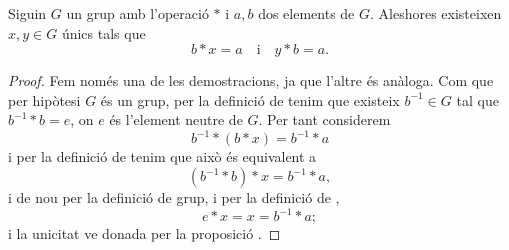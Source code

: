 \documentclass[../Apunts.tex]{subfiles}
\begin{document}
	\begin{lemma}
		\label{lema:solucions úniques en grups a equacions}
		Siguin \(G\) un grup amb l'operació \(\ast\) i \(a,b\) dos elements de \(G\). Aleshores existeixen \(x,y\in G\) únics tals que
		\[b\ast x=a\quad\text{i}\quad y\ast b=a.\]
		\begin{proof}
			Fem només una de les demostracions, ja que l'altre és anàloga. Com que per hipòtesi \(G\) és un grup, per la definició de  tenim que existeix \(b^{-1}\in G\) tal que \(b^{-1}\ast b=e\), on \(e\) és l'element neutre de \(G\). Per tant considerem
			\[b^{-1}\ast(b\ast x)=b^{-1}\ast a\]
			i per la definició de  tenim que això és equivalent a
			\[(b^{-1}\ast b)\ast x=b^{-1}\ast a,\]
			i de nou per la definició de grup, i per la definició de ,
			\[e\ast x=x=b^{-1}\ast a ;\]
			i la unicitat ve donada per la proposició .
		\end{proof}
	\end{lemma}
\end{document}
